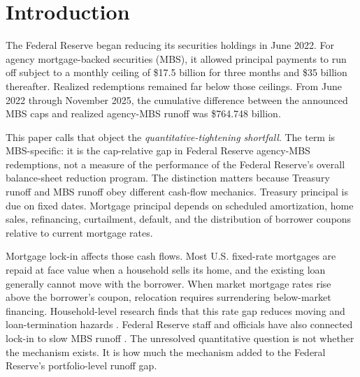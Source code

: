 
\section{Introduction}\label{sec:intro}\label{fn:manifest}

The Federal Reserve began reducing its securities holdings in June 2022. For agency mortgage-backed securities (MBS), it allowed principal payments to run off subject to a monthly ceiling of \$17.5 billion for three months and \$35 billion thereafter. Realized redemptions remained far below those ceilings. From June 2022 through November 2025, the cumulative difference between the announced MBS caps and realized agency-MBS runoff was \$764.748 billion.

This paper calls that object the \emph{quantitative-tightening shortfall}. The term is MBS-specific: it is the cap-relative gap in Federal Reserve agency-MBS redemptions, not a measure of the performance of the Federal Reserve's overall balance-sheet reduction program. The distinction matters because Treasury runoff and MBS runoff obey different cash-flow mechanics. Treasury principal is due on fixed dates. Mortgage principal depends on scheduled amortization, home sales, refinancing, curtailment, default, and the distribution of borrower coupons relative to current mortgage rates.

Mortgage lock-in affects those cash flows. Most U.S. fixed-rate mortgages are repaid at face value when a household sells its home, and the existing loan generally cannot move with the borrower. When market mortgage rates rise above the borrower's coupon, relocation requires surrendering below-market financing. Household-level research finds that this rate gap reduces moving and loan-termination hazards \citep{berger2021,eichenbaum2022,liebersohn2024,batzer2024}. Federal Reserve staff and officials have also connected lock-in to slow MBS runoff \citep{na2024,perli2024,hammack2025}. The unresolved quantitative question is not whether the mechanism exists. It is how much the mechanism added to the Federal Reserve's portfolio-level runoff gap.

